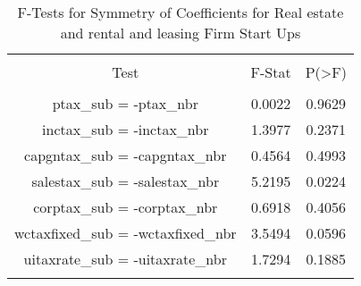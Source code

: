
\begin{table}[!htbp] \centering 
  \caption{F-Tests for Symmetry of Coefficients for Real estate and rental and leasing Firm Start Ups} 
  \label{53Ftests} 
\begin{tabular}{@{\extracolsep{5pt}} ccc} 
\\[-1.8ex]\hline 
\hline \\[-1.8ex] 
Test & F-Stat & P(\textgreater F) \\ 
\hline \\[-1.8ex] 
ptax\_sub = -ptax\_nbr & 0.0022 & 0.9629 \\ 
inctax\_sub = -inctax\_nbr & 1.3977 & 0.2371 \\ 
capgntax\_sub = -capgntax\_nbr & 0.4564 & 0.4993 \\ 
salestax\_sub = -salestax\_nbr & 5.2195 & 0.0224 \\ 
corptax\_sub = -corptax\_nbr & 0.6918 & 0.4056 \\ 
wctaxfixed\_sub = -wctaxfixed\_nbr & 3.5494 & 0.0596 \\ 
uitaxrate\_sub = -uitaxrate\_nbr & 1.7294 & 0.1885 \\ 
\hline \\[-1.8ex] 
\end{tabular} 
\end{table} 
